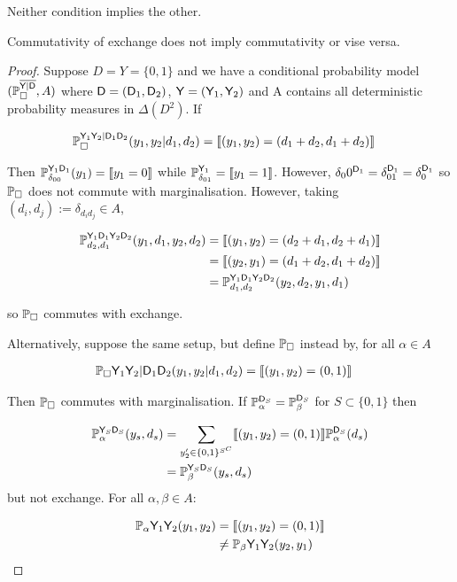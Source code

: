 Neither condition implies the other. 
\begin{lemma}
Commutativity of exchange does not imply commutativity or vise versa.
\end{lemma}

\begin{proof}
Suppose $D=Y=\{0,1\}$ and we have a conditional probability model $(\mathbb{P}_\square^{\overline{\mathsf{Y}|\mathsf{D}}},A)$ where $\mathsf{D}=(\mathsf{D}_1,\mathsf{D}_2)$, $\mathsf{Y}=(\mathsf{Y}_1,\mathsf{Y}_2)$ and A contains all deterministic probability measures in $\Delta(D^2)$. If

\begin{align}
    \mathbb{P}_\square^{\mathsf{Y}_1\mathsf{Y}_2|\mathsf{D}_1\mathsf{D}_2}(y_1,y_2|d_1,d_2) &= \llbracket (y_1,y_2)= (d_1+d_2,d_1+d_2) \rrbracket
\end{align}

Then $\mathbb{P}_{\delta_{00}}^{\mathsf{Y}_1\mathsf{D}_1}(y_1) = \llbracket y_1=0\rrbracket$ while $\mathbb{P}_{\delta_{01}}^{\mathsf{Y}_1} = \llbracket y_1=1 \rrbracket$. However, $\delta_00^{\mathsf{D}_1}=\delta_{01}^{\mathsf{D}_1}=\delta_0^{\mathsf{D}_1}$ so $\mathbb{P}_\square$ does not commute with marginalisation. However, taking $(d_i,d_j):=\delta_{d_i d_j}\in A$,

\begin{align}
    \mathbb{P}_{d_2,d_1}^{\mathsf{Y}_1\mathsf{D}_1\mathsf{Y}_2\mathsf{D}_2}(y_1,d_1,y_2,d_2) &= \llbracket (y_1,y_2)= (d_2+d_1,d_2+d_1) \rrbracket\\
    &= \llbracket (y_2,y_1)= (d_1+d_2,d_1+d_2) \rrbracket\\
    &= \mathbb{P}_{d_1,d_2}^{\mathsf{Y}_1\mathsf{D}_1\mathsf{Y}_2\mathsf{D}_2}(y_2,d_2,y_1,d_1)
\end{align}

so $\mathbb{P}_\square$ commutes with exchange.

Alternatively, suppose the same setup, but define $\mathbb{P}_\square$ instead by, for all $\alpha\in A$

\begin{align}
    \mathbb{P}_\square{\ensuremath{\mathsf{Y}}_1\ensuremath{\mathsf{Y}}_2|\ensuremath{\mathsf{D}}_1\ensuremath{\mathsf{D}}_2}(y_1,y_2|d_1,d_2) &= \llbracket (y_1,y_2)= (0,1) \rrbracket
\end{align}

Then $\mathbb{P}_\square$ commutes with marginalisation. If $\mathbb{P}_\alpha^{\mathsf{D}_S}=\mathbb{P}_\beta^{\mathsf{D}_S}$ for $S\subset\{0,1\}$ then

\begin{align}
    \mathbb{P}_{\alpha}^{\mathsf{Y}_S\mathsf{D}_S}(y_s,d_s) &= \sum_{y'_2\in \{0,1\}^{S^C}} \llbracket (y_1,y_2)= (0,1) \rrbracket\mathbb{P}_\alpha^{\mathsf{D}_S}(d_s) \\
                                                  &= \mathbb{P}_{\beta}^{\mathsf{Y}_S\mathsf{D}_S}(y_s,d_s)
\end{align}
but not exchange. For all $\alpha,\beta \in A$:

\begin{align}
    \mathbb{P}_\alpha{\ensuremath{\mathsf{Y}}_1\ensuremath{\mathsf{Y}}_2}(y_1,y_2) &= \llbracket (y_1,y_2)= (0,1) \rrbracket\\
    &\neq \mathbb{P}_\beta{\ensuremath{\mathsf{Y}}_1\ensuremath{\mathsf{Y}}_2}(y_2,y_1)
\end{align}
\end{proof}

